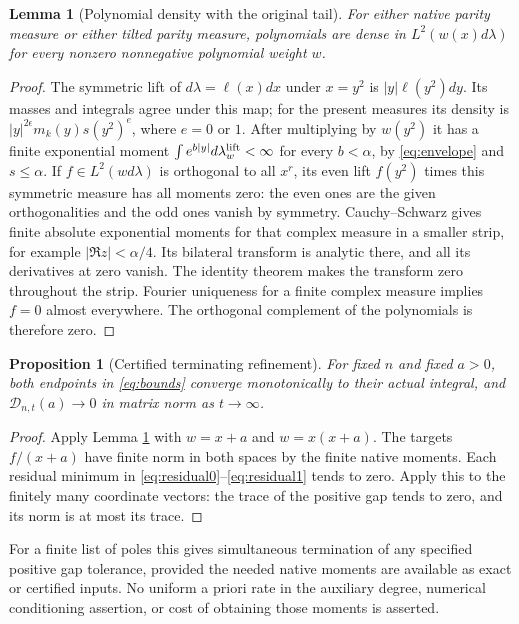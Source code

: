 \documentclass[11pt]{article}
\newtheorem{lemma}[theorem]{Lemma}
\newtheorem{proposition}[theorem]{Proposition}
\begin{document}
\begin{lemma}[Polynomial density with the original tail]\label{lem:density}
For either native parity measure or either tilted parity measure,
polynomials are dense in $L^2(w(x)d\lambda)$ for every nonzero
nonnegative polynomial weight $w$.
\end{lemma}
\begin{proof}
The symmetric lift of $d\lambda=\ell(x)dx$ under $x=y^2$ is
$|y|\ell(y^2)dy$.  Its masses and integrals agree under this map;
for the present measures its density is
$|y|^{2\epsilon}m_k(y)s(y^2)^e$, where $e=0$ or $1$.
After multiplying by $w(y^2)$ it has a finite exponential moment
$\int e^{b|y|}d\lambda_w^{\rm lift}<\infty$ for every $b<\alpha$,
by \eqref{eq:envelope} and $s\le\alpha$.
If $f\in L^2(wd\lambda)$ is orthogonal to all $x^r$, its even
lift $f(y^2)$ times this symmetric measure has all moments zero:
the even ones are the given orthogonalities and the odd ones vanish
by symmetry.  Cauchy--Schwarz gives finite absolute exponential
moments for that complex measure in a smaller strip, for example
$|\Re z|<\alpha/4$.  Its bilateral transform is analytic there,
and all its derivatives at zero vanish.  The identity theorem makes
the transform zero throughout the strip.  Fourier uniqueness for a
finite complex measure implies $f=0$ almost everywhere.  The
orthogonal complement of the polynomials is therefore zero.
\end{proof}

\begin{proposition}[Certified terminating refinement]\label{prop:converge}
For fixed $n$ and fixed $a>0$, both endpoints in \eqref{eq:bounds}
converge monotonically to their actual integral, and
$\mathcal D_{n,t}(a)\to0$ in matrix norm as $t\to\infty$.
\end{proposition}
\begin{proof}
Apply Lemma \ref{lem:density} with $w=x+a$ and $w=x(x+a)$.
The targets $f/(x+a)$ have finite norm in both spaces by the finite
native moments.  Each residual minimum in
\eqref{eq:residual0}--\eqref{eq:residual1} tends to zero.  Apply this
to the finitely many coordinate vectors: the trace of the positive
gap tends to zero, and its norm is at most its trace.
\end{proof}
For a finite list of poles this gives simultaneous termination of any
specified positive gap tolerance, provided the needed native moments
are available as exact or certified inputs.  No uniform a priori rate
in the auxiliary degree, numerical conditioning assertion, or cost of
obtaining those moments is asserted.
\end{document}
